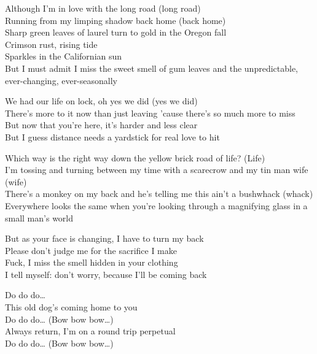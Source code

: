 
Although I'm in love with the long road (long road)\\
Running from my limping shadow back home (back home)\\
Sharp green leaves of laurel turn to gold in the Oregon fall\\
Crimson rust, rising tide\\
Sparkles in the Californian sun\\
But I must admit I miss the sweet smell of gum leaves and the unpredictable, ever-changing, ever-seasonally\\


We had our life on lock, oh yes we did (yes we did)\\
There's more to it now than just leaving 'cause there's so much more to miss\\
But now that you're here, it's harder and less clear\\
But I guess distance needs a yardstick for real love to hit\\


Which way is the right way down the yellow brick road of life? (Life)\\
I'm tossing and turning between my time with a scarecrow and my tin man wife (wife)\\
There's a monkey on my back and he's telling me this ain't a bushwhack (whack)\\
Everywhere looks the same when you're looking through a magnifying glass in a small man's world\\


But as your face is changing, I have to turn my back\\
Please don't judge me for the sacrifice I make\\
Fuck, I miss the smell hidden in your clothing\\
I tell myself: don't worry, because I'll be coming back\\


Do do do…\\
This old dog's coming home to you\\
Do do do… (Bow bow bow…)\\
Always return, I'm on a round trip perpetual\\
Do do do… (Bow bow bow…)\\


